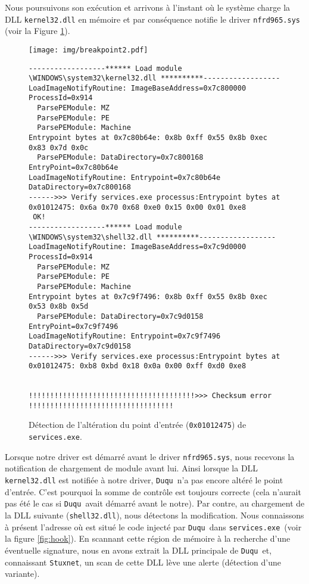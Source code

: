 \documentclass[times,11pt,fullpage]{article}
\newenvironment{changemargin}[2]{\begin{list}{}{%
\setlength{\topsep}{0pt}%
\setlength{\leftmargin}{0pt}%
\setlength{\rightmargin}{0pt}%
\setlength{\listparindent}{\parindent}%
\setlength{\itemindent}{\parindent}%
\setlength{\parsep}{0pt plus 1pt}%
\addtolength{\leftmargin}{#1}%
\addtolength{\rightmargin}{#2}%
}\item }{\end{list}}
\newcommand{\Duqu}{\texttt{Duqu}}
\newcommand{\Stuxnet}{\texttt{Stuxnet}}
\newcommand{\service}{\texttt{services.exe}}
\begin{document}
Nous poursuivons son exécution et arrivons à l'instant où le système charge la DLL \texttt{kernel32.dll} en mémoire et par conséquence notifie le driver \texttt{nfrd965.sys} (voir la Figure \ref{fig:Breakpoint2}).

\begin{figure}
\begin{changemargin}{-2cm}{-2cm}
\begin{center}
 \texttt{[image: img/breakpoint2.pdf]}
\end{center}
\end{changemargin}
\scriptsize
\begin{framed}
\begin{verbatim}
------------------****** Load module \WINDOWS\system32\kernel32.dll **********------------------
LoadImageNotifyRoutine: ImageBaseAddress=0x7c800000 ProcessId=0x914 
  ParsePEModule: MZ
  ParsePEModule: PE
  ParsePEModule: Machine
Entrypoint bytes at 0x7c80b64e: 0x8b 0xff 0x55 0x8b 0xec 0x83 0x7d 0x0c
  ParsePEModule: DataDirectory=0x7c800168 EntryPoint=0x7c80b64e
LoadImageNotifyRoutine: Entrypoint=0x7c80b64e DataDirectory=0x7c800168 
------>>> Verify services.exe processus:Entrypoint bytes at 0x01012475: 0x6a 0x70 0x68 0xe0 0x15 0x00 0x01 0xe8
 OK!
------------------****** Load module \WINDOWS\system32\shell32.dll **********------------------
LoadImageNotifyRoutine: ImageBaseAddress=0x7c9d0000 ProcessId=0x914 
  ParsePEModule: MZ
  ParsePEModule: PE
  ParsePEModule: Machine
Entrypoint bytes at 0x7c9f7496: 0x8b 0xff 0x55 0x8b 0xec 0x53 0x8b 0x5d
  ParsePEModule: DataDirectory=0x7c9d0158 EntryPoint=0x7c9f7496
LoadImageNotifyRoutine: Entrypoint=0x7c9f7496 DataDirectory=0x7c9d0158 
------>>> Verify services.exe processus:Entrypoint bytes at 0x01012475: 0xb8 0xbd 0x18 0x0a 0x00 0xff 0xd0 0xe8


!!!!!!!!!!!!!!!!!!!!!!!!!!!!!!!!!!!!!!!>>> Checksum error !!!!!!!!!!!!!!!!!!!!!!!!!!!!!!!!!!
\end{verbatim}
\end{framed}
\caption{Détection de l'altération du point d'entrée (\texttt{0x01012475}) de \texttt{\service}.\label{fig:Breakpoint2}}
\end{figure}

Lorsque notre driver est démarré avant le driver \texttt{nfrd965.sys}, nous recevons la notification de chargement de module avant lui. Ainsi lorsque la DLL \texttt{kernel32.dll} est notifiée à notre driver, \Duqu\ n'a pas encore altéré le point d'entrée. C'est pourquoi la somme de contrôle est toujours correcte (cela n'aurait pas été le cas si \Duqu\ avait démarré avant le notre). Par contre, au chargement de la DLL suivante (\texttt{shell32.dll}), nous détectons la modification. Nous connaissons à présent l'adresse où est situé le code injecté par \Duqu\ dans \service\ (voir la figure \ref{fig:hook}). En scannant cette région de mémoire à la recherche d'une éventuelle signature, nous en avons extrait la DLL principale de \Duqu\ et, connaissant \Stuxnet, un scan de cette DLL lève une alerte (détection d'une variante).
\end{document}
